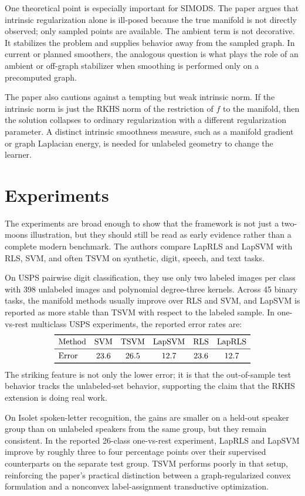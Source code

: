 \documentclass[11pt]{article}
\begin{document}
One theoretical point is especially important for SIMODS.  The paper argues
that intrinsic regularization alone is ill-posed because the true manifold is
not directly observed; only sampled points are available.  The ambient term is
not decorative.  It stabilizes the problem and supplies behavior away from
the sampled graph.  In current or planned  smoothers, the
analogous question is what plays the role of an ambient or off-graph
stabilizer when smoothing is performed only on a precomputed graph.

The paper also cautions against a tempting but weak intrinsic norm.  If the
intrinsic norm is just the RKHS norm of the restriction of $f$ to the
manifold, then the solution collapses to ordinary regularization with a
different regularization parameter.  A distinct intrinsic smoothness measure,
such as a manifold gradient or graph Laplacian energy, is needed for unlabeled
geometry to change the learner.

\section{Experiments}

The experiments are broad enough to show that the framework is not just a
two-moons illustration, but they should still be read as early evidence rather
than a complete modern benchmark.  The authors compare LapRLS and LapSVM with
RLS, SVM, and often TSVM on synthetic, digit, speech, and text tasks.

On USPS pairwise digit classification, they use only two labeled images per
class with 398 unlabeled images and polynomial degree-three kernels.  Across
45 binary tasks, the manifold methods usually improve over RLS and SVM, and
LapSVM is reported as more stable than TSVM with respect to the labeled
sample.  In one-vs-rest multiclass USPS experiments, the reported error rates
are:
\[
\begin{array}{lccccc}
\toprule
\text{Method} & \text{SVM} & \text{TSVM} & \text{LapSVM} & \text{RLS} & \text{LapRLS}\\
\midrule
\text{Error} & 23.6 & 26.5 & 12.7 & 23.6 & 12.7\\
\bottomrule
\end{array}
\]
The striking feature is not only the lower error; it is that the out-of-sample
test behavior tracks the unlabeled-set behavior, supporting the claim that
the RKHS extension is doing real work.

On Isolet spoken-letter recognition, the gains are smaller on a held-out
speaker group than on unlabeled speakers from the same group, but they remain
consistent.  In the reported 26-class one-vs-rest experiment, LapRLS and
LapSVM improve by roughly three to four percentage points over their
supervised counterparts on the separate test group.  TSVM performs poorly in
that setup, reinforcing the paper's practical distinction between a
graph-regularized convex formulation and a nonconvex label-assignment
transductive optimization.
\end{document}

